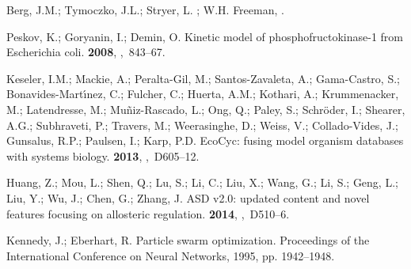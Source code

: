 \documentclass[processes,article,accept,moreauthors,pdftex,12pt,a4paper]{mdpi}
\begin{document}
\begin{thebibliography}{----}
Berg, J.M.; Tymoczko, J.L.; Stryer, L.
; W.H. Freeman,
.

Peskov, K.; Goryanin, I.; Demin, O.
\newblock Kinetic model of phosphofructokinase-1 from Escherichia coli.
 {\bf 2008},
,~843--67.

Keseler, I.M.; Mackie, A.; Peralta-Gil, M.; Santos-Zavaleta, A.; Gama-Castro,
  S.; Bonavides-Mart{\'\i}nez, C.; Fulcher, C.; Huerta, A.M.; Kothari, A.;
  Krummenacker, M.; Latendresse, M.; Mu{\~n}iz-Rascado, L.; Ong, Q.; Paley, S.;
  Schr{\"o}der, I.; Shearer, A.G.; Subhraveti, P.; Travers, M.; Weerasinghe,
  D.; Weiss, V.; Collado-Vides, J.; Gunsalus, R.P.; Paulsen, I.; Karp, P.D.
\newblock EcoCyc: fusing model organism databases with systems biology.
 {\bf 2013},
,~D605--12.

Huang, Z.; Mou, L.; Shen, Q.; Lu, S.; Li, C.; Liu, X.; Wang, G.; Li, S.; Geng,
  L.; Liu, Y.; Wu, J.; Chen, G.; Zhang, J.
\newblock ASD v2.0: updated content and novel features focusing on allosteric
  regulation.
 {\bf 2014},
,~D510--6.

Kennedy, J.; Eberhart, R.
\newblock Particle swarm optimization.
\newblock  Proceedings of the International Conference on Neural Networks,
  1995,
\newblock pp. 1942--1948.

\end{thebibliography}
\end{document}
